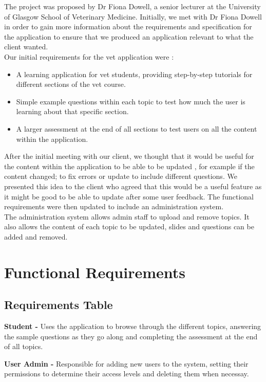 \documentclass{l3proj}
\begin{document}
The project was proposed by Dr Fiona Dowell, a senior lecturer at the University of Glasgow School of Veterinary Medicine. Initially, we met with Dr Fiona Dowell in order to gain more information about the requirements and specification for the application to ensure that we produced an application relevant to what the client wanted.\\
Our initial requirements for the vet application were :

\begin{itemize}
\item A learning application for vet students, providing step-by-step tutorials for different sections of the vet course.
\item Simple example questions within each topic to test how much the user is learning about that specific section.
\item A larger assessment at the end of all sections to test users on all the content within the application.
\end{itemize}

After the initial meeting with our client, we thought that it would be useful for the content within the application to be able to be updated , for example if the content changed; to fix errors or update to include different questions. We presented this idea to the client who agreed that this would be a useful feature as it might be good to be able to update after some user feedback. The functional requirements were then updated to include an administration system.\\
The administration system allows admin staff to upload and remove topics. It also allows the content of each topic to be updated, slides and questions can be added and removed.


\section{Functional Requirements}

\subsection{Requirements Table}

\textbf{Student -} Uses the application to browse through the different topics, answering the sample questions as they go along and completing the assessment at the end of all topics.

\textbf{User Admin -} Responsible for adding new users to the system, setting their permissions to determine their access levels and deleting them when necessay.
\end{document}
